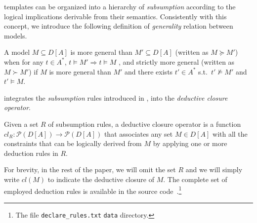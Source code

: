 \declare templates can be organized into a hierarchy of \emph{subsumption} \cite{2017-DiCiccio} according to the logical implications derivable from their semantics. Consistently with this concept, we introduce the following definition of \emph{generality} relation between models.
\begin{definition}{}\label{def:subs}
A model $M\subseteq D[A]$ is more general than $M'\subseteq D[A]$ (written as $M \succeq M'$) when for any $t\in A^*$, $t\models M' \Rightarrow t\models M$ , and strictly more general (written as $M \succ M'$) if $M$ is more general than $M'$ and there exists $t'\in A^*$ s.t.\ $t'\not\models M'$ and $t'\models M$.
\end{definition}

\nd integrates the \emph{subsumption} rules introduced in \cite{2017-DiCiccio}, into the \emph{deductive closure operator}.

\begin{definition}{}
Given a set $R$ of subsumption rules, a deductive closure operator is a function $cl_R: \mathcal{P}(D[A])\rightarrow\mathcal{P}(D[A])$ that associates any set $M \in D[A]$ with all the constraints that can be logically derived from $M$ by applying one or more deduction rules in $R$.
\end{definition}
For brevity, in the rest of the paper, we will omit the set $R$ and we will simply write $cl(M)$ to indicate the deductive closure of $M$. The complete set of employed deduction rules is available in the source code~\cite{zenodo:experiments}.\footnote{The file \texttt{declare\_rules.txt} %
\texttt{data} directory.}%




